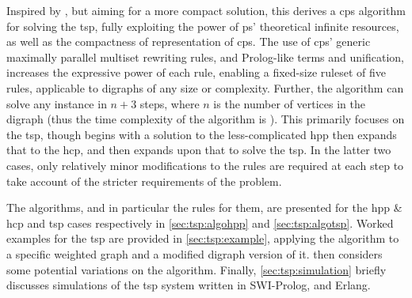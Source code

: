Inspired by \cite{Guo2017}, but aiming for a more compact solution, this  derives a \gls{cps} algorithm for solving the \gls{tsp}, fully exploiting the power of \gls{ps}' theoretical infinite resources, as well as the compactness of representation of \gls{cps}.  The use of \gls{cps}' generic maximally parallel multiset rewriting rules, and Prolog-like terms and unification, increases the expressive power of each rule, enabling a fixed-size \gls{ruleset} of five rules, applicable to digraphs of any size or complexity.   Further, the algorithm can solve any instance in \(n + 3\) steps, where \(n\) is the number of vertices in the digraph (thus the time complexity of the algorithm is ).  This  primarily focuses on the \gls{tsp}, though begins with a solution to the less-complicated \gls{hpp} then expands that to the \gls{hcp}, and then expands upon that to solve the \gls{tsp}.  In the latter two cases, only relatively minor modifications to the rules are required at each step to take account of the stricter requirements of the problem.

The algorithms, and in particular the rules for them, are presented for the \gls{hpp} \& \gls{hcp} and \gls{tsp} cases respectively in \cref{sec:tsp:algohpp} and \cref{sec:tsp:algotsp}.  Worked examples for the \gls{tsp} are provided in \cref{sec:tsp:example}, applying the algorithm to a specific weighted graph and a modified digraph version of it.   then considers some potential variations on the algorithm.  Finally, \cref{sec:tsp:simulation} briefly discusses simulations of the \gls{tsp} system written in SWI-Prolog, \fsharp{} and Erlang.